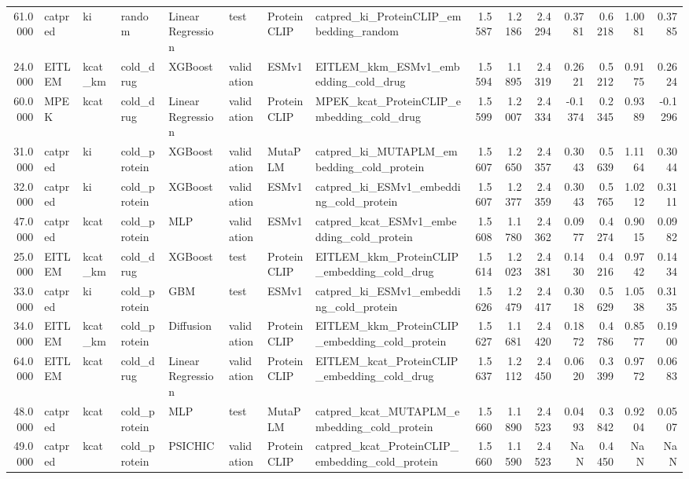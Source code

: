 \begin{tabular}{rlllllllrrrrrrr}
61.0000 & catpred & ki & random & Linear Regression & test & ProteinCLIP & catpred_ki_ProteinCLIP_embedding_random & 1.5587 & 1.2186 & 2.4294 & 0.3781 & 0.6218 & 1.0081 & 0.3785 \\
24.0000 & EITLEM & kcat_km & cold_drug & XGBoost & validation & ESMv1 & EITLEM_kkm_ESMv1_embedding_cold_drug & 1.5594 & 1.1895 & 2.4319 & 0.2621 & 0.5212 & 0.9175 & 0.2624 \\
60.0000 & MPEK & kcat & cold_drug & Linear Regression & validation & ProteinCLIP & MPEK_kcat_ProteinCLIP_embedding_cold_drug & 1.5599 & 1.2007 & 2.4334 & -0.1374 & 0.2345 & 0.9389 & -0.1296 \\
31.0000 & catpred & ki & cold_protein & XGBoost & validation & MutaPLM & catpred_ki_MUTAPLM_embedding_cold_protein & 1.5607 & 1.2650 & 2.4357 & 0.3043 & 0.5639 & 1.1164 & 0.3044 \\
32.0000 & catpred & ki & cold_protein & XGBoost & validation & ESMv1 & catpred_ki_ESMv1_embedding_cold_protein & 1.5607 & 1.2377 & 2.4359 & 0.3043 & 0.5765 & 1.0212 & 0.3111 \\
47.0000 & catpred & kcat & cold_protein & MLP & validation & ESMv1 & catpred_kcat_ESMv1_embedding_cold_protein & 1.5608 & 1.1780 & 2.4362 & 0.0977 & 0.4274 & 0.9015 & 0.0982 \\
25.0000 & EITLEM & kcat_km & cold_drug & XGBoost & test & ProteinCLIP & EITLEM_kkm_ProteinCLIP_embedding_cold_drug & 1.5614 & 1.2023 & 2.4381 & 0.1430 & 0.4216 & 0.9742 & 0.1434 \\
33.0000 & catpred & ki & cold_protein & GBM & test & ESMv1 & catpred_ki_ESMv1_embedding_cold_protein & 1.5626 & 1.2479 & 2.4417 & 0.3018 & 0.5629 & 1.0538 & 0.3135 \\
34.0000 & EITLEM & kcat_km & cold_protein & Diffusion & validation & ProteinCLIP & EITLEM_kkm_ProteinCLIP_embedding_cold_protein & 1.5627 & 1.1681 & 2.4420 & 0.1872 & 0.4786 & 0.8577 & 0.1900 \\
64.0000 & EITLEM & kcat & cold_drug & Linear Regression & validation & ProteinCLIP & EITLEM_kcat_ProteinCLIP_embedding_cold_drug & 1.5637 & 1.2112 & 2.4450 & 0.0620 & 0.3399 & 0.9772 & 0.0683 \\
48.0000 & catpred & kcat & cold_protein & MLP & test & MutaPLM & catpred_kcat_MUTAPLM_embedding_cold_protein & 1.5660 & 1.1890 & 2.4523 & 0.0493 & 0.3842 & 0.9204 & 0.0507 \\
49.0000 & catpred & kcat & cold_protein & PSICHIC & validation & ProteinCLIP & catpred_kcat_ProteinCLIP_embedding_cold_protein & 1.5660 & 1.1590 & 2.4523 & NaN & 0.4450 & NaN & NaN \\

\end{tabular}
